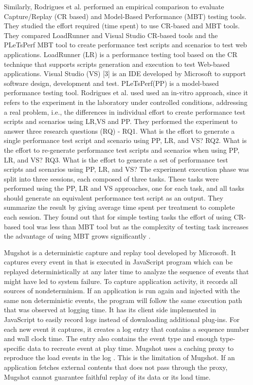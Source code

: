 \documentclass[12pt,journal]{IEEEtran}
\begin{document}
Similarly, Rodrigues et al. performed an empirical comparison to evaluate Capture/Replay (CR based) and Model-Based Performance (MBT) testing tools. They studied the effort required (time spent) to use CR-based and MBT tools. They compared LoadRunner and Visual Studio CR-based tools and the PLeTsPerf MBT tool to create performance test scripts and scenarios to test web applications. LoadRunner (LR) is a performance testing tool based on the CR technique that supports scripts generation and execution to test Web-based applications. Visual Studio (VS) [3] is an IDE developed by Microsoft to support software design, development and test. PLeTsPerf(PP) is a model-based performance testing tool. Rodrigues et al. used used an in-vitro approach, since it refers to the experiment in the laboratory under controlled conditions, addressing a real problem, i.e., the differences in individual effort to create performance test scripts and scenarios using LR,VS and PP. They performed the experiment to answer three research questions (RQ) - RQ1. What is the effort to generate a single performance test script and scenario using PP, LR, and VS? RQ2. What is the effort to re-generate performance test scripts and scenarios when using PP, LR, and VS? RQ3. What is the effort to generate a set of performance test scripts and scenarios using PP, LR, and VS? The experiment execution phase was split into three sessions, each composed of three tasks. These tasks were performed using the PP, LR  and VS approaches, one for each task, and all tasks should generate an equivalent performance test script as an output. They summarize the result by giving average time spent per treatment to complete each session. They found out that for simple testing tasks the effort of using CR-based tool was less than MBT tool but as the complexity of testing task increases the advantage of using MBT grows significantly \cite{Rodrigues:2014:ECR:2652524.2652587}.

Mugshot is a deterministic capture and replay tool developed by Microsoft. It captures every event in  that is executed in JavaScript program which can be replayed deterministically at any later time to analyze the sequence of events that might have led to system failure. To capture application activity, it records all sources of nondeterminism. If an application is run again and injected with the same non deterministic events, the program will follow the same execution path that was observed at logging time. It has its client side implemented in JavaScript to easily record logs instead of downloading additional plug-ins. For each new event it captures, it creates a log entry that contains a sequence number and wall clock time. The entry also contains the event type and enough type-specific data to recreate event at play time. Mugshot uses a caching proxy to reproduce the load events in the log \cite{Mickens:2010:MDC:1855711.1855722}. This is the limitation of Mugshot. If an application fetches external contents that does not pass through the proxy, Mugshot cannot guarantee faithful replay of its data or its load time.
\end{document}
